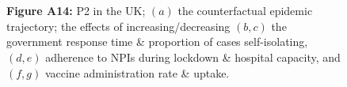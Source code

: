 \documentclass[paper=a4,fontsize=11pt]{article}
\begin{document}
\begin{figure}[!h]
  \\
  \hspace{1.76cm}
  \\
  \caption*{\textbf{Figure A14:} P2 in the UK; $(a)$ the counterfactual epidemic trajectory; the effects of increasing/decreasing $(b,c)$ the government response time \& proportion of cases self-isolating, $(d,e)$ adherence to NPIs during lockdown \& hospital capacity, and $(f,g)$ vaccine administration rate \& uptake.}
\end{figure}
\end{document}
